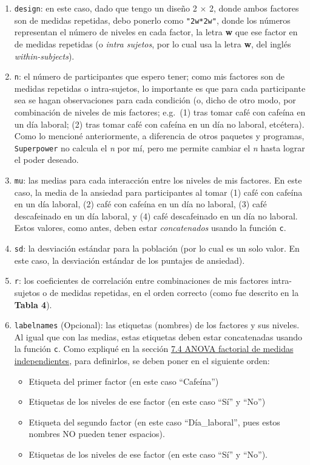 \documentclass[
]{article}
\providecommand{\tightlist}{%
  \setlength{\itemsep}{0pt}\setlength{\parskip}{0pt}}
\begin{document}
\begin{enumerate}
\def\labelenumi{\arabic{enumi}.}
\item
  \texttt{design}: en este caso, dado que tengo un diseño 2 \(\times\)
  2, donde ambos factores son de medidas repetidas, debo ponerlo como
  \texttt{"2w*2w"}, donde los números representan el número de niveles
  en cada factor, la letra \textbf{w} que ese factor en de medidas
  repetidas (o \emph{intra sujetos}, por lo cual usa la letra
  \textbf{w}, del inglés \emph{within-subjects}).
\item
  \texttt{n}: el número de participantes que espero tener; como mis
  factores son de medidas repetidas o intra-sujetos, lo importante es
  que para cada participante sea se hagan observaciones para cada
  condición (o, dicho de otro modo, por combinación de niveles de mis
  factores; e.g.~(1) tras tomar café con cafeína en un día laboral; (2)
  tras tomar café con cafeína en un día no laboral, etcétera). Como lo
  mencioné anteriormente, a diferencia de otros paquetes y programas,
  \texttt{Superpower} no calcula el \emph{n} por mí, pero me permite
  cambiar el \emph{n} hasta lograr el poder deseado.
\item
  \texttt{mu}: las medias para cada interacción entre los niveles de mis
  factores. En este caso, la media de la ansiedad para participantes al
  tomar (1) café con cafeína en un día laboral, (2) café con cafeína en
  un día no laboral, (3) café descafeinado en un día laboral, y (4) café
  descafeinado en un día no laboral. Estos valores, como antes, deben
  estar \emph{concatenados} usando la función \texttt{c}.
\item
  \texttt{sd}: la desviación estándar para la población (por lo cual es
  un solo valor. En este caso, la desviación estándar de los puntajes de
  ansiedad).
\item
  \texttt{r}: los coeficientes de correlación entre combinaciones de mis
  factores intra-sujetos o de medidas repetidas, en el orden correcto
  (como fue descrito en la \textbf{Tabla 4}).
\item
  \texttt{labelnames} (Opcional): las etiquetas (nombres) de los
  factores y sus niveles. Al igual que con las medias, estas etiquetas
  deben estar concatenadas usando la función \texttt{c}. Como expliqué
  en la sección \protect\hyperlink{ind}{7.4 ANOVA factorial de medidas
  independientes}, para definirlos, se deben poner en el siguiente
  orden:

  \begin{itemize}
  \tightlist
  \item
    Etiqueta del primer factor (en este caso ``Cafeína'')
  \item
    Etiquetas de los niveles de ese factor (en este caso ``Sí'' y
    ``No'')
  \item
    Etiqueta del segundo factor (en este caso ``Día\_laboral'', pues
    estos nombres NO pueden tener espacios).
  \item
    Etiquetas de los niveles de ese factor (en este caso ``Sí'' y
    ``No'').
  \end{itemize}
\end{enumerate}
\end{document}
